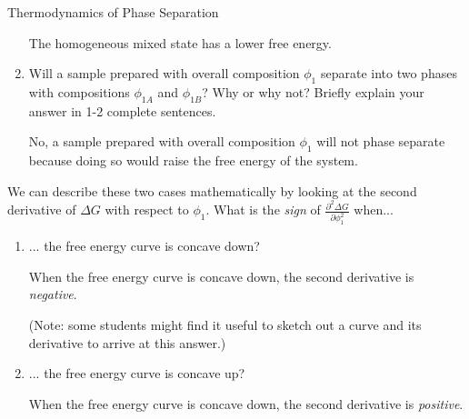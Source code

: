 \begin{activity}{Thermodynamics of Phase Separation}
\begin{ctqs}
\begin{enumerate}
\begin{solution}[0.75in]
						The homogeneous mixed state has a lower free energy.
					
					\end{solution}
					
				\item Will a sample prepared with overall composition $\phi_1$ separate into two phases with compositions $\phi_{1A}$ and $\phi_{1B}$?  Why or why not?  Briefly explain your answer in 1-2 complete sentences.
					
					\begin{solution}[2in]
					
						No, a sample prepared with overall composition $\phi_1$ will not phase separate because doing so would raise the free energy of the system.
					
					\end{solution}
					
			\end{enumerate}
			
		\question We can describe these two cases mathematically by looking at the second derivative of $\Delta G$ with respect to $\phi_1$.		
			What is the \emph{sign} of $\frac{\partial^2 \Delta G}{\partial \phi_1^2}$ when...
			
			\begin{enumerate}
				\item ... the free energy curve is concave down?
					
					\begin{solution}[1in]
					
						When the free energy curve is concave down, the second derivative is \emph{negative}.
						
						(Note: some students might find it useful to sketch out a curve and its derivative to arrive at this answer.)
					
					\end{solution}
					
				\item ... the free energy curve is concave up?
					
					\begin{solution}[1in]
					
						When the free energy curve is concave down, the second derivative is \emph{positive}.
						
					\end{solution}
					
			\end{enumerate}
		

\end{ctqs}
\end{activity}
